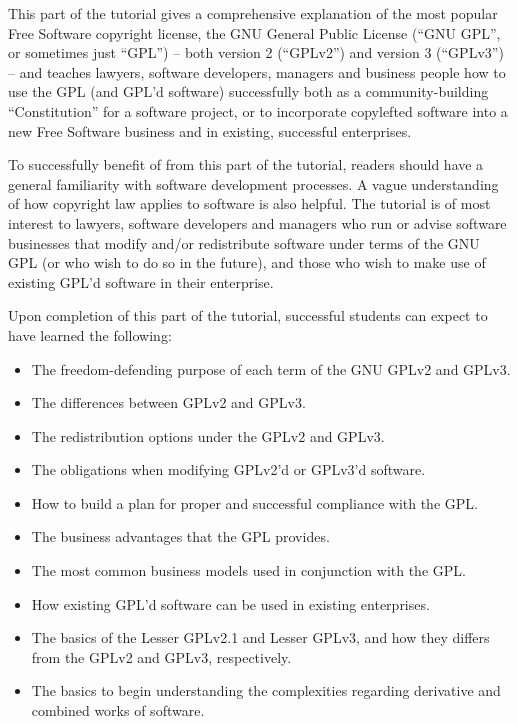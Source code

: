 \bigskip

This part of the tutorial gives a comprehensive explanation of the most
popular Free Software copyright license, the GNU General Public License
(``GNU GPL'', or sometimes just ``GPL'') -- both version 2 (``GPLv2'') and
version 3 (``GPLv3'') -- and teaches lawyers, software developers, managers
and business people how to use the GPL (and GPL'd software) successfully both
as a community-building ``Constitution'' for a software project, or to
incorporate copylefted software into a new Free Software business and in
existing, successful enterprises.

To successfully benefit of from this part of the tutorial, readers should
have a general familiarity with software development processes.  A vague
understanding of how copyright law applies to software is also helpful.  The
tutorial is of most interest to lawyers, software developers and managers who
run or advise software businesses that modify and/or redistribute software
under terms of the GNU GPL (or who wish to do so in the future), and those
who wish to make use of existing GPL'd software in their enterprise.

Upon completion of this part of the tutorial, successful students can expect
to have learned the following:

\begin{itemize}

  \item The freedom-defending purpose of each term of the GNU GPLv2 and GPLv3.

  \item The differences between GPLv2 and GPLv3.

  \item The redistribution options under the GPLv2 and GPLv3.

  \item The obligations when modifying GPLv2'd or GPLv3'd software.

  \item How to build a plan for proper and successful compliance with the GPL.

  \item The business advantages that the GPL provides.

  \item The most common business models used in conjunction with the GPL.

  \item How existing GPL'd software can be used in existing enterprises.

  \item The basics of the Lesser GPLv2.1 and Lesser GPLv3, and how they
    differs from the GPLv2 and GPLv3, respectively.

  \item The basics to begin understanding the complexities regarding
    derivative and combined works of software.
\end{itemize}

